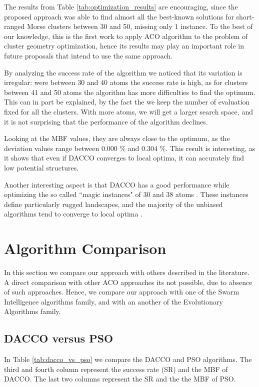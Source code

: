 	The results from Table \ref{tab:optimization_results} are encouraging, since the proposed approach was able to find almost all the best-known solutions for short-ranged Morse clusters between 30 and 50, missing only 1 instance.
	To the best of our knowledge, this is the first work to apply ACO algorithm to the problem of cluster geometry optimization, hence its results may play an important role in future proposals that intend to use the same approach.
	
	By analyzing the success rate of the algorithm we noticed that its variation is irregular: were between 30 and 40 atoms the success rate is high, as for clusters between 41 and 50 atoms the algorithm has more difficulties to find the optimum. This can in part be explained, by the fact the we keep the number of evaluation fixed for all the clusters. With more atoms, we will get a larger search space, and it is not surprising that the performance of the algorithm declines.
	
	Looking at the MBF values, they are always close to the optimum, as the deviation values range between 0.000 \% and 0.304 \%. This result is interesting, as it shows that even if DACCO converges to local optima, it can accurately find low potential structures.
	
	Another interesting aspect is that DACCO has a good performance while optimizing the so called ``magic instances" of 30 and 38 atoms \cite{doye97}. These instances define particularly rugged landscapes, and the majority of the unbiased algorithms tend to converge to local optima \cite{doye97, grosso07}.
	
	\section{Algorithm Comparison}
	\label{sec:algorithm_comparison}
	In this section we compare our approach with others described in the literature. A direct comparison with other ACO approaches its not possible, due to absence of such approaches. Hence, we compare our approach with one of the Swarm Intelligence algorithms family, and with an another of the Evolutionary Algorithms family.
	
	\subsection{DACCO versus PSO}
	In Table \ref{tab:dacco_vs_pso} we compare the DACCO and PSO algorithms. The third and fourth column represent the success rate (SR) and the MBF of DACCO. The last two columns represent the SR and the the MBF of PSO. 
	
